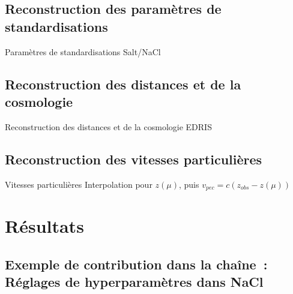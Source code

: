 \documentclass{beamer}
\begin{document}
\subsection{Reconstruction des paramètres de standardisations}

\begin{frame}{Paramètres de standardisations}
Salt/NaCl
\end{frame}

\subsection{Reconstruction des distances et de la cosmologie}

\begin{frame}{Reconstruction des distances et de la cosmologie}
EDRIS
\end{frame}

\subsection{Reconstruction des vitesses particulières}


\begin{frame}{Vitesses particulières}
Interpolation pour $z(\mu)$, puis $v_{pec} = c(z_{obs} - z(\mu))$
\end{frame}

\section{Résultats}

\subsection[Contribution dans \textsc{Lemaître}]{Exemple de contribution dans la chaîne~: Réglages de hyperparamètres dans NaCl}
\end{document}
